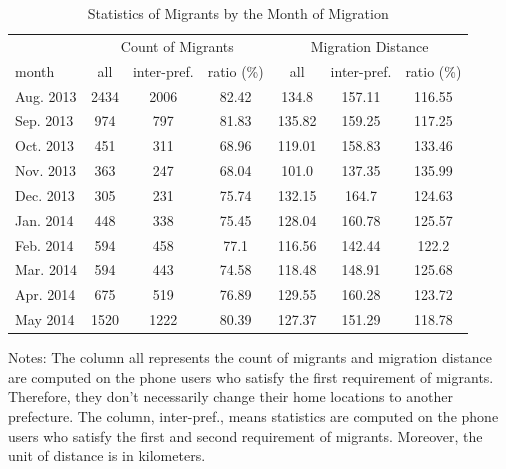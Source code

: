 \begin{table}[htbp]
\vspace{0.2cm}
\renewcommand{\arraystretch}{1.6}
\setlength{\tabcolsep}{4mm}{}
\centering
\small
\caption{Statistics of Migrants by the Month of Migration}
\begin{tabular}{lcccccc} \hline
& \multicolumn{3}{c}{Count of Migrants} & \multicolumn{3}{c}{Migration Distance} \\
\cline{2-4} \cline{5-7}
month & all & inter-pref. & ratio (\%) & all & inter-pref. & ratio (\%) \\ \hline
Aug. 2013 & 2434 & 2006 & 82.42 & 134.8 & 157.11 & 116.55 \\
Sep. 2013 & 974 & 797 & 81.83 & 135.82 & 159.25 & 117.25 \\
Oct. 2013 & 451 & 311 & 68.96 & 119.01 & 158.83 & 133.46 \\
Nov. 2013 & 363 & 247 & 68.04 & 101.0 & 137.35 & 135.99 \\
Dec. 2013 & 305 & 231 & 75.74 & 132.15 & 164.7 & 124.63 \\
Jan. 2014 & 448 & 338 & 75.45 & 128.04 & 160.78 & 125.57 \\
Feb. 2014 & 594 & 458 & 77.1 & 116.56 & 142.44 & 122.2 \\
Mar. 2014 & 594 & 443 & 74.58 & 118.48 & 148.91 & 125.68 \\
Apr. 2014 & 675 & 519 & 76.89 & 129.55 & 160.28 & 123.72 \\
May 2014 & 1520 & 1222 & 80.39 & 127.37 & 151.29 & 118.78 \\
\hline
\end{tabular}
\label{tab:migration_sample}%
\end{table}%

\vspace{-2.5em}
\begin{singlespace}
\begin{footnotesize}
\noindent Notes: The column all represents the count of migrants and migration distance are computed on the phone users who satisfy the first requirement of migrants. Therefore, they don't necessarily change their home locations to another prefecture. The column, inter-pref., means statistics are computed on the phone users who satisfy the first and second requirement of migrants. Moreover, the unit of distance is in kilometers.
\end{footnotesize}
\end{singlespace}

